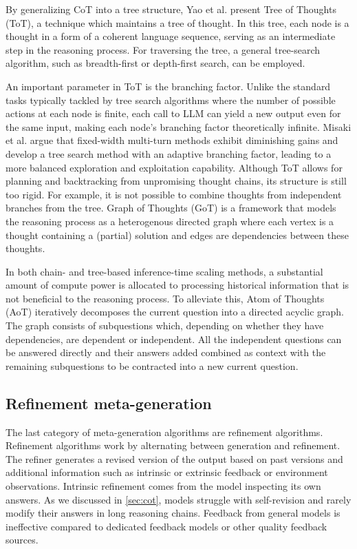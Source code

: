 By generalizing CoT\cite{wei2023chainofthoughtpromptingelicitsreasoning}\cite{NEURIPS2022_8bb0d291} into a tree structure,
Yao et al.\cite{yao2023treethoughtsdeliberateproblem} present Tree of Thoughts (ToT), a technique which maintains a tree of thought.
In this tree, each node is a thought in a form of a coherent language sequence, serving as an intermediate step
in the reasoning process. For traversing the tree, a general tree-search algorithm, such as breadth-first or depth-first search, can be employed.

An important parameter in ToT is the branching factor. Unlike the standard tasks typically tackled by tree search algorithms 
where the number of possible actions at each node is finite, each call to LLM can yield a new output even for 
the same input, making each node's branching factor theoretically infinite\cite{misaki2025widerdeeperscalingllm}.
Misaki et al.\cite{misaki2025widerdeeperscalingllm} argue that fixed-width multi-turn methods exhibit diminishing gains 
and develop a tree search method with an adaptive branching factor, leading to a more balanced exploration and exploitation capability. 
\newpage
Although ToT allows for planning and backtracking from unpromising thought chains, its structure is still too rigid\cite{Besta_2024}.
For example, it is not possible to combine thoughts from independent branches from the tree. Graph of Thoughts\cite{Besta_2024} (GoT) is 
a framework that models the reasoning process as a heterogenous directed graph where each vertex is a thought containing a (partial) solution
and edges are dependencies between these thoughts\cite{Besta_2024}. 

In both chain- and tree-based inference-time scaling methods, a substantial amount of compute power is allocated to
processing historical information that is not beneficial to the reasoning process. To alleviate this,
Atom of Thoughts\cite{teng2025atomthoughtsmarkovllm} (AoT) iteratively decomposes the current question into a directed acyclic graph.
The graph consists of subquestions which, depending on whether they have dependencies, are dependent or independent.
All the independent questions can be answered directly and their answers added combined as context with the remaining subquestions
to be contracted into a new current question. 

\subsection{Refinement meta-generation}
The last category of meta-generation algorithms are refinement algorithms. Refinement algorithms work by alternating between generation and refinement.
The refiner generates a revised version of the output based on past versions and additional information such as intrinsic or extrinsic feedback or environment observations\cite{welleck2024decodingmetagenerationinferencetimealgorithms}. 
Intrinsic refinement comes from the model inspecting its own answers. As we discussed in \ref{sec:cot}, models struggle with self-revision and rarely modify their answers in long reasoning chains.
Feedback from general models is ineffective compared to dedicated feedback models or other quality feedback sources\cite{wang2025dedicatedfeedbackeditmodels}. 


